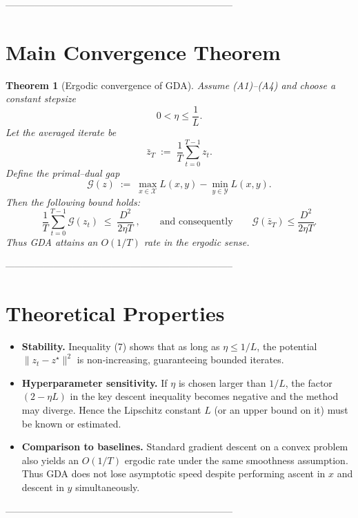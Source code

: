 \documentclass{article}
\newtheorem{theorem}{Theorem}
\begin{document}
-----------------------------------------------------------------------

\section*{Main Convergence Theorem}
\begin{theorem}[Ergodic convergence of GDA]\label{thm:main}
Assume (A1)–(A4) and choose a constant stepsize
\[
0<\eta\le\frac{1}{L}.                                                \tag{5}
\]
Let the averaged iterate be
\[
\bar z_T\;:=\;\frac1T\sum_{t=0}^{T-1}z_t .
\]
Define the primal–dual gap
\[
\mathcal G(z)\;:=\;
\max_{x\in\mathcal X}L(x,y)-\min_{y\in\mathcal Y}L(x,y).                \tag{6}
\]
Then the following bound holds:
\[
\boxed{
\frac1T\sum_{t=0}^{T-1}\mathcal G(z_t)
\;\le\;
\frac{D^{2}}{2\eta T}\;,
\qquad\text{and consequently}\qquad
\mathcal G(\bar z_T)\le\frac{D^{2}}{2\eta T}.}
\tag{7}
\]
Thus GDA attains an $O(1/T)$ rate in the ergodic sense.
\end{theorem}

-----------------------------------------------------------------------

\section*{Theoretical Properties}
\begin{itemize}
\item \textbf{Stability.}  
Inequality (7) shows that as long as $\eta\le1/L$, the
potential $\|z_t-z^{\star}\|^{2}$ is non‑increasing, guaranteeing
bounded iterates.

\item \textbf{Hyperparameter sensitivity.}  
If $\eta$ is chosen larger than $1/L$, the factor $(2-\eta L)$ in the
key descent inequality becomes negative and the method may diverge.
Hence the Lipschitz constant $L$ (or an upper bound on it) must be
known or estimated.

\item \textbf{Comparison to baselines.}  
Standard gradient descent on a convex problem also yields an
$O(1/T)$ ergodic rate under the same smoothness assumption.
Thus GDA does not lose asymptotic speed despite performing
ascent in $x$ and descent in $y$ simultaneously.
\end{itemize}

-----------------------------------------------------------------------
\end{document}
